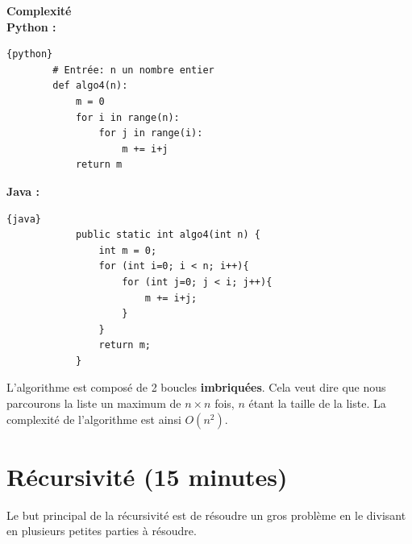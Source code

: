 \begin{Exercice}[10 minutes] \textbf{Complexité \optionnel} \\        
        \textbf{Python :}
        \begin{lstlisting}{python}
        # Entrée: n un nombre entier
        def algo4(n):
            m = 0
            for i in range(n):
                for j in range(i):
                    m += i+j
            return m
        \end{lstlisting}
        
        \textbf{Java :}
        \begin{lstlisting}{java}
            public static int algo4(int n) {
                int m = 0;
                for (int i=0; i < n; i++){
                    for (int j=0; j < i; j++){
                        m += i+j;
                    }
                }
                return m;
            }
        \end{lstlisting}
    \begin{solution} 
    L'algorithme est composé de 2 boucles \textbf{imbriquées}. Cela veut dire que nous parcourons la liste un maximum de $n \times n$ fois, $n$ étant la taille de la liste. La complexité de l'algorithme est ainsi $O(n^2)$.
    \end{solution}
    
\end{Exercice}
    
        
\section{Récursivité (15 minutes)}

Le but principal de la récursivité est de résoudre un gros problème en le divisant en plusieurs petites parties à résoudre.

